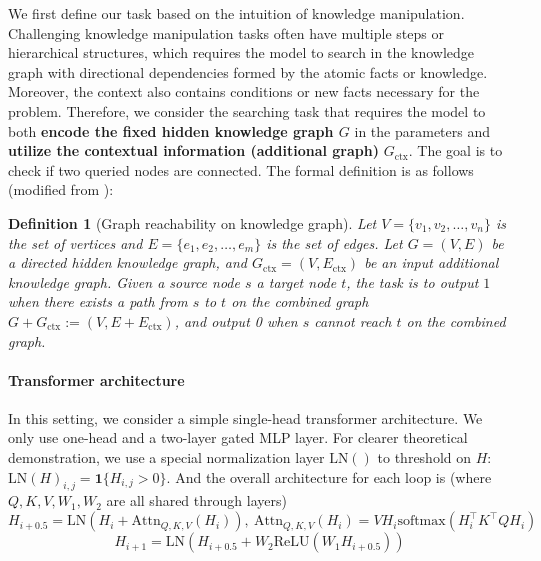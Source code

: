 \documentclass[]{bytedance_seed}
\newcommand{\1}{\mathbf{1}}
\newtheorem{definition}{Definition}
\begin{document}
We first define our task based on the intuition of knowledge manipulation. Challenging knowledge manipulation tasks often have multiple steps or hierarchical structures, which requires the model to search in the knowledge graph with directional dependencies formed by the atomic facts or knowledge. Moreover, the context also contains conditions or new facts necessary for the problem. Therefore, we consider the searching task that requires the model to both \textbf{encode the fixed hidden knowledge graph $G$} in the parameters and \textbf{utilize the contextual information (additional graph)} $G_{\text{ctx}}$. The goal is to check if two queried nodes are connected. The formal definition is as follows (modified from \cite{zhu2025reasoning}):
\begin{definition}[Graph reachability on knowledge graph]
    Let $V = \{v_1, v_2, \ldots, v_n\}$ is the set
of vertices and $E = \{e_1, e_2, \ldots, e_m\}$ is the set of edges. Let $G = (V, E)$ be a directed hidden knowledge graph, and $G_{\text{ctx}}=(V,E_{\text{ctx}})$ be an input additional knowledge graph. 
Given a source node $s$ a target node $t$, the task is to output $1$ when there exists a path from $s$ to $t$ on the combined graph $G+G_{\text{ctx}}:= (V,E+E_{\text{ctx}})$, and output 0 when $s$ cannot reach $t$ on the combined graph.
\end{definition}
\paragraph{Transformer architecture} In this setting, we consider a simple single-head transformer architecture. We only use one-head and a two-layer gated MLP layer. For clearer theoretical demonstration, we use a special normalization layer $\mathrm{LN}()$ to threshold on $H$: $\mathrm{LN}(H)_{i,j}=\mathbf{1}\{H_{i,j}>0\}$. And the overall architecture for each loop is (where $Q,K,V,W_1,W_2$ are all shared through layers)
$$H_{i+0.5}=\mathrm{LN}(H_i+\mathrm{Attn}_{Q,K,V}(H_i)),\ \mathrm{Attn}_{Q,K,V}(H_i)=VH_i\text{softmax}(H_i^\top K^\top QH_i)$$
$$H_{i+1}=\mathrm{LN}(H_{i+0.5}+W_2 \mathrm{ReLU}(W_1H_{i+0.5}))$$
\end{document}
